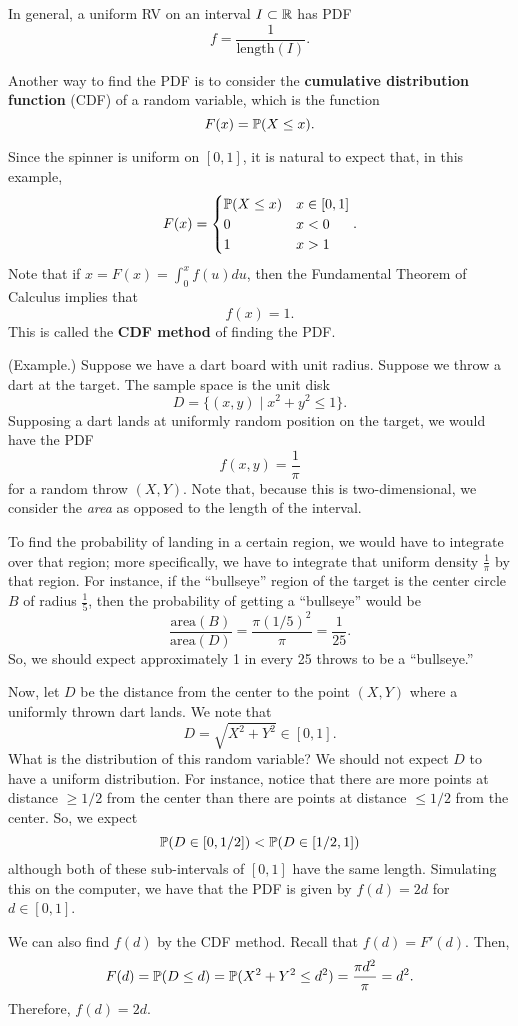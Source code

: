 \documentclass[letterpaper]{article}
\begin{document}
\bigskip 

In general, a uniform RV on an interval $I \subset \mathbb{R}$ has PDF 
\[f = \frac{1}{\text{length}(I)}.\]

Another way to find the PDF is to consider the \textbf{cumulative distribution function} (CDF) of a random variable, which is the function 
\[F(x) = \mathbb{P}(X \leq x).\]

\bigskip 

Since the spinner is uniform on $[0, 1]$, it is natural to expect that, in this example,
\[F(x) = \begin{cases}
    \mathbb{P}(X \leq x) & x \in [0, 1] \\ 
    0 & x < 0 \\ 
    1 & x > 1
\end{cases}.\]
Note that if $x = F(x) = \int_0^x f(u) du$, then the Fundamental Theorem of Calculus implies that 
\[f(x) = 1.\]
This is called the \textbf{CDF method} of finding the PDF. 

\begin{mdframed}[]
    (Example.) Suppose we have a dart board with unit radius. Suppose we throw a dart at the target. The sample space is the unit disk 
    \[D = \{(x, y) \mid x^2 + y^2 \leq 1\}.\]
    Supposing a dart lands at uniformly random position on the target, we would have the PDF 
    \[f(x, y) = \frac{1}{\pi}\]
    for a random throw $(X, Y)$. Note that, because this is two-dimensional, we consider the \emph{area} as opposed to the length of the interval. 

    \bigskip 

    To find the probability of landing in a certain region, we would have to integrate over that region; more specifically, we have to integrate that uniform density $\frac{1}{\pi}$ by that region. For instance, if the ``bullseye'' region of the target is the center circle $B$ of radius $\frac{1}{5}$, then the probability of getting a ``bullseye'' would be 
    \[\frac{\text{area}(B)}{\text{area}(D)} = \frac{\pi(1 / 5)^2}{\pi} = \frac{1}{25}.\]
    So, we should expect approximately 1 in every 25 throws to be a ``bullseye.''

    \bigskip 

    Now, let $D$ be the distance from the center to the point $(X, Y)$ where a uniformly thrown dart lands. We note that 
    \[D = \sqrt{X^2 + Y^2} \in [0, 1].\]
    What is the distribution of this random variable? We should not expect $D$ to have a uniform distribution. For instance, notice that there are more points at distance $\geq 1/2$ from the center than there are points at distance $\leq 1/2$ from the center. So, we expect 
    \[\mathbb{P}(D \in [0, 1/2]) < \mathbb{P}(D \in [1/2, 1])\]
    although both of these sub-intervals of $[0, 1]$ have the same length. Simulating this on the computer, we have that the PDF is given by $f(d) = 2d$ for $d \in [0, 1]$.
    
    \bigskip 

    We can also find $f(d)$ by the CDF method. Recall that $f(d) = F'(d)$. Then, 
    \[F(d) = \mathbb{P}(D \leq d) = \mathbb{P}(X^2 + Y^2 \leq d^2) = \frac{\pi d^2}{\pi} = d^2.\]
    Therefore, $f(d) = 2d$. 
\end{mdframed}
\end{document}
